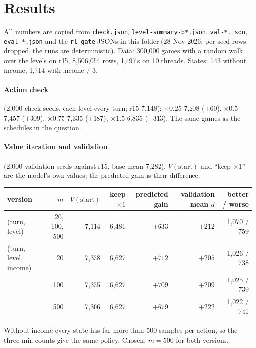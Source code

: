 \documentclass{../polyexp}
\begin{document}
\section{Results}
\ExpResults

All numbers are copied from \texttt{check.json}, \texttt{level-summary-b*.json}, \texttt{val-*.json},
\texttt{eval-*.json} and the \texttt{rl-gate} JSONs in this folder (28 Nov 2026; per-seed rows dropped, the runs are
deterministic). Data: 300{,}000 games with a random walk over the levels on r15, 8{,}506{,}054 rows, 1{,}497\,s on
10 threads. States: 143 without income, 1{,}714 with income / 3.

\paragraph{Action check} (2{,}000 check seeds, each level every turn; r15 7{,}148): $\times0.25$ 7{,}208 ($+60$),
$\times0.5$ 7{,}457 ($+309$), $\times0.75$ 7{,}335 ($+187$), $\times1.5$ 6{,}835 ($-313$). The same games as the
schedules in the question.

\paragraph{Value iteration and validation} (2{,}000 validation seeds against r15, base mean 7{,}282).
$V(\text{start})$ and ``keep $\times1$'' are the model's own values; the predicted gain is their difference.

\begin{center}\small
\begin{tabular}{lrrrrrr}
\toprule
version & $m$ & $V(\text{start})$ & keep $\times1$ & predicted gain & validation mean $d$ & better / worse \\
\midrule
(turn, level)          & 20, 100, 500 & 7{,}114 & 6{,}481 & $+633$ & $+212$ & 1{,}070 / 759 \\
(turn, level, income)  & 20           & 7{,}338 & 6{,}627 & $+712$ & $+205$ & 1{,}026 / 738 \\
                       & 100          & 7{,}335 & 6{,}627 & $+709$ & $+209$ & 1{,}025 / 739 \\
                       & 500          & 7{,}306 & 6{,}627 & $+679$ & $+222$ & 1{,}022 / 741 \\
\bottomrule
\end{tabular}
\end{center}

Without income every state has far more than 500 samples per action, so the three min-counts give the same policy.
Chosen: $m = 500$ for both versions.
\end{document}
